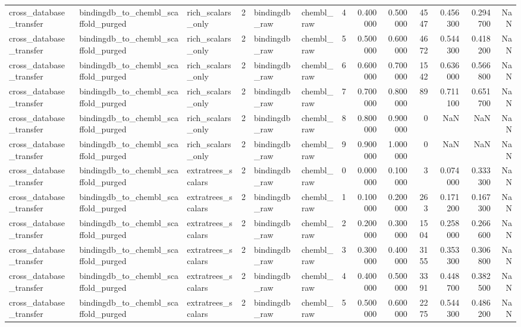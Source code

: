 \begin{longtable}{lllrllrrrrrrr}
cross\_database\_transfer & bindingdb\_to\_chembl\_scaffold\_purged & rich\_scalars\_only & 2 & bindingdb\_raw & chembl\_raw & 4 & 0.400000 & 0.500000 & 4547 & 0.456300 & 0.294700 & NaN \\
cross\_database\_transfer & bindingdb\_to\_chembl\_scaffold\_purged & rich\_scalars\_only & 2 & bindingdb\_raw & chembl\_raw & 5 & 0.500000 & 0.600000 & 4672 & 0.544300 & 0.418200 & NaN \\
cross\_database\_transfer & bindingdb\_to\_chembl\_scaffold\_purged & rich\_scalars\_only & 2 & bindingdb\_raw & chembl\_raw & 6 & 0.600000 & 0.700000 & 1542 & 0.636000 & 0.566800 & NaN \\
cross\_database\_transfer & bindingdb\_to\_chembl\_scaffold\_purged & rich\_scalars\_only & 2 & bindingdb\_raw & chembl\_raw & 7 & 0.700000 & 0.800000 & 89 & 0.711100 & 0.651700 & NaN \\
cross\_database\_transfer & bindingdb\_to\_chembl\_scaffold\_purged & rich\_scalars\_only & 2 & bindingdb\_raw & chembl\_raw & 8 & 0.800000 & 0.900000 & 0 & NaN & NaN & NaN \\
cross\_database\_transfer & bindingdb\_to\_chembl\_scaffold\_purged & rich\_scalars\_only & 2 & bindingdb\_raw & chembl\_raw & 9 & 0.900000 & 1.000000 & 0 & NaN & NaN & NaN \\
cross\_database\_transfer & bindingdb\_to\_chembl\_scaffold\_purged & extratrees\_scalars & 2 & bindingdb\_raw & chembl\_raw & 0 & 0.000000 & 0.100000 & 3 & 0.074000 & 0.333300 & NaN \\
cross\_database\_transfer & bindingdb\_to\_chembl\_scaffold\_purged & extratrees\_scalars & 2 & bindingdb\_raw & chembl\_raw & 1 & 0.100000 & 0.200000 & 263 & 0.171200 & 0.167300 & NaN \\
cross\_database\_transfer & bindingdb\_to\_chembl\_scaffold\_purged & extratrees\_scalars & 2 & bindingdb\_raw & chembl\_raw & 2 & 0.200000 & 0.300000 & 1504 & 0.258000 & 0.266600 & NaN \\
cross\_database\_transfer & bindingdb\_to\_chembl\_scaffold\_purged & extratrees\_scalars & 2 & bindingdb\_raw & chembl\_raw & 3 & 0.300000 & 0.400000 & 3155 & 0.353300 & 0.306800 & NaN \\
cross\_database\_transfer & bindingdb\_to\_chembl\_scaffold\_purged & extratrees\_scalars & 2 & bindingdb\_raw & chembl\_raw & 4 & 0.400000 & 0.500000 & 3391 & 0.448700 & 0.382500 & NaN \\
cross\_database\_transfer & bindingdb\_to\_chembl\_scaffold\_purged & extratrees\_scalars & 2 & bindingdb\_raw & chembl\_raw & 5 & 0.500000 & 0.600000 & 2275 & 0.544300 & 0.486200 & NaN \\

\end{longtable}
